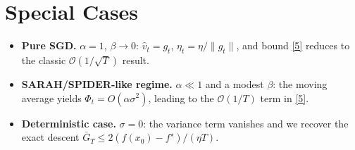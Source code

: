 \documentclass{article}
\begin{document}
\section*{Special Cases}
\begin{itemize}
\item \textbf{Pure SGD.} $\alpha=1$, $\beta\to0$:
    $\hat v_t=g_t$, $\eta_t=\eta/\|g_t\|$, and bound \eqref{5}
    reduces to the classic $\mathcal{O}(1/\sqrt{T})$ result.
\item \textbf{SARAH/SPIDER‑like regime.} $\alpha\ll1$ and a modest $\beta$:
    the moving average yields $\Phi_t=O(\alpha\sigma^{2})$, leading to the
    $\mathcal{O}(1/T)$ term in \eqref{5}.
\item \textbf{Deterministic case.} $\sigma=0$:
    the variance term vanishes and we recover the exact descent
    $\bar G_T\le 2(f(x_0)-f^{\star})/(\eta T)$.
\end{itemize}
\end{document}
